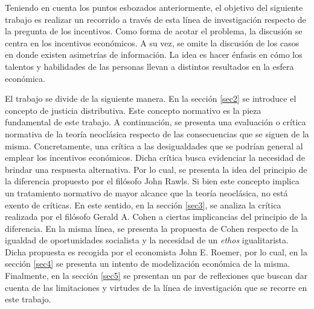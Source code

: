 Teniendo en cuenta los puntos esbozados anteriormente, el objetivo del siguiente trabajo es realizar un recorrido a través de esta línea de investigación respecto de la pregunta de los incentivos. Como forma de acotar el problema, la discusión se centra en los incentivos económicos. A su vez, se omite la discusión de los casos en donde existen asimetrías de información. La idea es hacer énfasis en cómo los talentos y habilidades de las personas llevan a distintos resultados en la esfera económica. 

El trabajo se divide de la siguiente manera. En la sección \ref{sec2} se introduce el concepto de justicia distributiva. Este concepto normativo es la pieza fundamental de este trabajo. A continuación, se presenta una evaluación o crítica normativa de la teoría neoclásica respecto de las consecuencias que se siguen de la misma. Concretamente, una crítica a las desigualdades que se podrían general al emplear los incentivos económicos. Dicha crítica busca evidenciar la necesidad de brindar una respuesta alternativa. Por lo cual, se presenta la idea del principio de la diferencia propuesto por el filósofo John Rawls. Si bien este concepto implica un tratamiento normativo de mayor alcance que la teoría neoclásica, no está exento de críticas. En este sentido, en la sección \ref{sec3}, se analiza la crítica realizada por el filósofo Gerald A. Cohen a ciertas implicancias del principio de la diferencia. En la misma línea, se presenta la propuesta de Cohen respecto de la igualdad de oportunidades socialista y la necesidad de un \textit{ethos} igualitarista. Dicha propuesta es recogida por el economista John E. Roemer, por lo cual, en la sección \ref{sec4} se presenta un intento de modelización económica de la misma. Finalmente, en la sección \ref{sec5} se presentan un par de reflexiones que buscan dar cuenta de las limitaciones y virtudes de la línea de investigación que se recorre en este trabajo.
